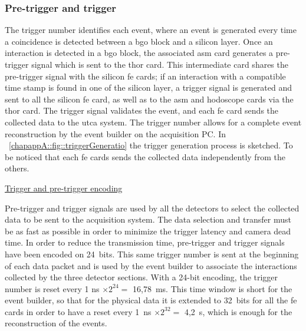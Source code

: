 
\subsubsection{Pre-trigger and trigger}\label{chapappA::subsubsec::trigger}
The trigger number identifies each event, where an event is generated every time a coincidence is detected between a \gls{bgo} block and a silicon layer. Once an interaction is detected in a \gls{bgo} block, the associated \gls{asm} card generates a pre-trigger signal which is sent to the \gls{thor} card. This intermediate card shares the pre-trigger signal with the silicon \gls{fe} cards; if an interaction with a compatible time stamp is found in one of the silicon layer, a trigger signal is generated and sent to all the silicon \gls{fe} card, as well as to the \gls{asm} and hodoscope cards via the \gls{thor} card. The trigger signal validates the event, and each \gls{fe} card sends the collected data to the \gls{utca} system. The trigger number allows for a complete event reconstruction by the event builder on the acquisition PC. In \figurename~\ref{chapappA::fig::triggerGeneratio} the trigger generation process is sketched.\newline
To be noticed that each \gls{fe} cards sends the collected data independently from the others.\newline


\underline{Trigger and pre-trigger encoding}\newline

Pre-trigger and trigger signals are used by all the detectors to select the collected data to be sent to the acquisition system. The data selection and transfer must be as fast as possible in order to minimize the trigger latency and camera dead time. In order to reduce the transmission time, pre-trigger and trigger signals have been encoded on 24~bits.\newline
This same trigger number is sent at the beginning of each data packet and is used by the event builder to associate the interactions collected by the three detector sections. With a 24-bit encoding, the trigger number is reset every 1 ns $\times \mathrm{2^{24}} =$ 16,78~ms. This time window is short for the event builder, so that for the physical data it is extended to 32~bits for all the \gls{fe} cards in order to have a reset every 1~ns $\times \mathrm{2^{32}} =$ 4,2~s, which is enough for the reconstruction of the events.


